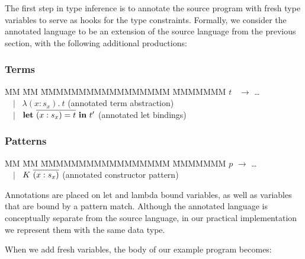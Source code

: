 The first step in type inference is to annotate the source program with fresh type variables to serve as hooks for the type constraints. Formally, we consider the annotated language to be an extension of the source language from the previous section, with the following additional productions:

\vspace{-1em}
\subsubsection{Terms}
\vspace{-1ex}
\begin{tabbing}
MM 	\= MM \= MMMMMMMMMMMMMMMMM \= MMMMMMM \kill
$t$ 	\> \ $\to$	\> \dots \\
	\> \ \ $\mid$	\> \ $\lambda (x : s_x). \ t$				\> (annotated term abstraction)	\\[1ex]
	\> \ \ $\mid$	\> \ $\rblet \ \ov{(x : s_x) = t} \ \rbin \ t'$	\> (annotated let bindings) 	\\
\end{tabbing}

\vspace{-2em}
\subsubsection{Patterns}
\vspace{-1ex}
\begin{tabbing}
MM 	\= MM \= MMMMMMMMMMMMMMMMM \= MMMMMMM \kill
$p$ 	\> $\to$ 	\> \dots \\
	\> \ \ $\mid$	\> \ $K \ \overline{(x : s_x)}$				\> (annotated constructor pattern) 
\end{tabbing}

Annotations are placed on let and lambda bound variables, as well as variables that are bound by a pattern match. Although the annotated language is conceptually separate from the source language, in our practical implementation we represent them with the same data type.

When we add fresh variables, the body of our example program becomes:


